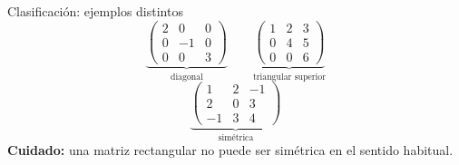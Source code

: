 \documentclass[aspectratio=169,11pt]{beamer}
\begin{document}
\begin{frame}{Clasificación: ejemplos distintos}
\[\underbrace{\begin{pmatrix}2&0&0\\0&-1&0\\0&0&3\end{pmatrix}}_{\text{diagonal}}\qquad\underbrace{\begin{pmatrix}1&2&3\\0&4&5\\0&0&6\end{pmatrix}}_{\text{triangular superior}}\]
\[\underbrace{\begin{pmatrix}1&2&-1\\2&0&3\\-1&3&4\end{pmatrix}}_{\text{simétrica}}\]
\textbf{Cuidado:} una matriz rectangular no puede ser simétrica en el sentido habitual.
\end{frame}
\end{document}
